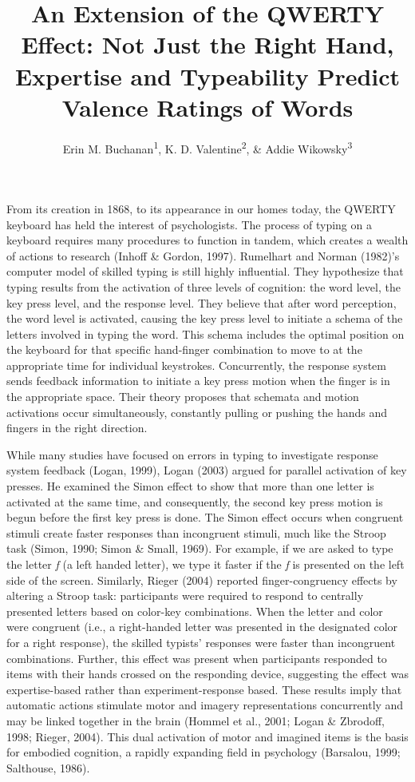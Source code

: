\documentclass[
  english,
  man,mask]{apa7}
\title{An Extension of the QWERTY Effect: Not Just the Right Hand, Expertise and Typeability Predict Valence Ratings of Words}
\author{Erin M. Buchanan\textsuperscript{1}, K. D. Valentine\textsuperscript{2}, \& Addie Wikowsky\textsuperscript{3}}
\date{}
\affiliation{\vspace{0.5cm}\textsuperscript{1} Harrisburg Univeristy of Science and Technology\\\textsuperscript{2} Massachusetts General Hospital\\\textsuperscript{3} Clinvest Research LLC}
\begin{document}
\maketitle

From its creation in 1868, to its appearance in our homes today, the QWERTY keyboard has held the interest of psychologists. The process of typing on a keyboard requires many procedures to function in tandem, which creates a wealth of actions to research (Inhoff \& Gordon, 1997). Rumelhart and Norman (1982)'s computer model of skilled typing is still highly influential. They hypothesize that typing results from the activation of three levels of cognition: the word level, the key press level, and the response level. They believe that after word perception, the word level is activated, causing the key press level to initiate a schema of the letters involved in typing the word. This schema includes the optimal position on the keyboard for that specific hand-finger combination to move to at the appropriate time for individual keystrokes. Concurrently, the response system sends feedback information to initiate a key press motion when the finger is in the appropriate space. Their theory proposes that schemata and motion activations occur simultaneously, constantly pulling or pushing the hands and fingers in the right direction.

While many studies have focused on errors in typing to investigate response system feedback (Logan, 1999), Logan (2003) argued for parallel activation of key presses. He examined the Simon effect to show that more than one letter is activated at the same time, and consequently, the second key press motion is begun before the first key press is done. The Simon effect occurs when congruent stimuli create faster responses than incongruent stimuli, much like the Stroop task (Simon, 1990; Simon \& Small, 1969). For example, if we are asked to type the letter \emph{f} (a left handed letter), we type it faster if the \emph{f} is presented on the left side of the screen. Similarly, Rieger (2004) reported finger-congruency effects by altering a Stroop task: participants were required to respond to centrally presented letters based on color-key combinations. When the letter and color were congruent (i.e., a right-handed letter was presented in the designated color for a right response), the skilled typists' responses were faster than incongruent combinations. Further, this effect was present when participants responded to items with their hands crossed on the responding device, suggesting the effect was expertise-based rather than experiment-response based. These results imply that automatic actions stimulate motor and imagery representations concurrently and may be linked together in the brain (Hommel et al., 2001; Logan \& Zbrodoff, 1998; Rieger, 2004). This dual activation of motor and imagined items is the basis for embodied cognition, a rapidly expanding field in psychology (Barsalou, 1999; Salthouse, 1986).
\end{document}
